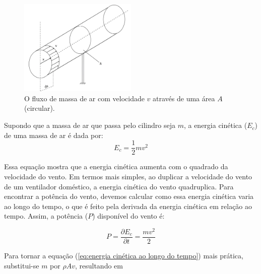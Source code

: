         \begin{figure}[H]
            \caption{O fluxo de massa de ar com velocidade $v$ através de uma área $A$ (circular).}
            \label{fig:Fluxo de massa de ar com velocidade V através de uma área A}
            \centering
            \includegraphics[width=0.5\textwidth]{Figuras/Teorico/Fluxo de massa de ar com velocidade V através de uma área A.jpeg}
        \end{figure}
     
        Supondo que a massa de ar que passa pelo cilindro seja $m$, a energia cinética ($E_c$) de uma massa de ar é dada por:
        \begin{equation}
            E_c = \frac{1}{2}mv^2 
            \label{eq:energia cinetica}
        \end{equation}

        \par Essa equação mostra que a energia cinética aumenta com o quadrado da velocidade do vento. Em termos mais simples, ao duplicar a velocidade do vento de um ventilador doméstico, a energia cinética do vento quadruplica. Para encontrar a potência do vento, devemos calcular como essa energia cinética varia ao longo do tempo, o que é feito pela derivada da energia cinética em relação ao tempo. Assim, a potência ($P$) disponível do vento é:

        \begin{equation}
            P = \frac{\partial E_c}{\partial t} = \frac{mv^2}{2} 
            \label{eq:energia cinética ao longo do tempo}
        \end{equation}
        
        \par Para tornar a equação (\ref{eq:energia cinética ao longo do tempo}) mais prática, substitui-se $m$ por $\rho A v$, resultando em
        

